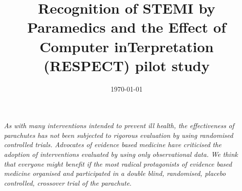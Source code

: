 \documentclass[a4paper, 11pt, oneside]{Thesis}  %
\begin{document}
\frontmatter	  %
\title  {Recognition of STEMI by Paramedics and the Effect of Computer inTerpretation (RESPECT) pilot study}
\addresses  {\groupname\\\deptname\\\univname}  %

\date       {\today}
\subject    {A dissertation submitted in partial fulfilment for the degree of Masters of Clinical Research}

\maketitle


\fancyhead{}  %
\rhead{\thepage}  %
\lhead{}  %

\pagestyle{fancy}  %

\setcounter{page}{2}
\pagestyle{empty}  %

\null\vfill
\textit{As with many interventions intended to prevent ill health, the effectiveness of parachutes has not been subjected to rigorous evaluation by using randomised controlled trials. Advocates of evidence based medicine have criticised the adoption of interventions evaluated by using only observational data.  We think that everyone might benefit if the most radical protagonists of evidence based medicine organised and participated in a double blind, randomised, placebo controlled, crossover trial of the parachute.}
\end{document}
